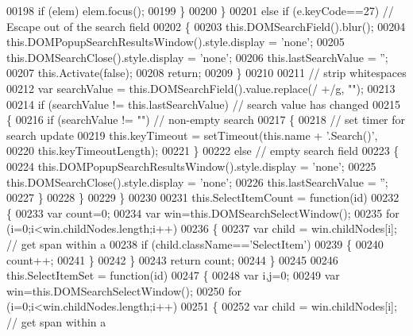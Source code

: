\begin{DoxyCode}
00198         \textcolor{keywordflow}{if} (elem) elem.focus();
00199       \}
00200     \}
00201     \textcolor{keywordflow}{else} \textcolor{keywordflow}{if} (e.keyCode==27) \textcolor{comment}{// Escape out of the search field}
00202     \{
00203       this.DOMSearchField().blur();
00204       this.DOMPopupSearchResultsWindow().style.display = \textcolor{stringliteral}{'none'};
00205       this.DOMSearchClose().style.display = \textcolor{stringliteral}{'none'};
00206       this.lastSearchValue = \textcolor{stringliteral}{''};
00207       this.Activate(\textcolor{keyword}{false});
00208       \textcolor{keywordflow}{return};
00209     \}
00210 
00211     \textcolor{comment}{// strip whitespaces}
00212     var searchValue = this.DOMSearchField().value.replace(/ +/g, \textcolor{stringliteral}{""});
00213 
00214     \textcolor{keywordflow}{if} (searchValue != this.lastSearchValue) \textcolor{comment}{// search value has changed}
00215     \{
00216       \textcolor{keywordflow}{if} (searchValue != \textcolor{stringliteral}{""}) \textcolor{comment}{// non-empty search}
00217       \{
00218         \textcolor{comment}{// set timer for search update}
00219         this.keyTimeout = setTimeout(this.name + \textcolor{stringliteral}{'.Search()'},
00220                                      this.keyTimeoutLength);
00221       \}
00222       \textcolor{keywordflow}{else} \textcolor{comment}{// empty search field}
00223       \{
00224         this.DOMPopupSearchResultsWindow().style.display = \textcolor{stringliteral}{'none'};
00225         this.DOMSearchClose().style.display = \textcolor{stringliteral}{'none'};
00226         this.lastSearchValue = \textcolor{stringliteral}{''};
00227       \}
00228     \}
00229   \}
00230 
00231   this.SelectItemCount = \textcolor{keyword}{function}(id)
00232   \{
00233     var count=0;
00234     var win=this.DOMSearchSelectWindow(); 
00235     \textcolor{keywordflow}{for} (i=0;i<win.childNodes.length;i++)
00236     \{
00237       var child = win.childNodes[i]; \textcolor{comment}{// get span within a}
00238       \textcolor{keywordflow}{if} (child.className==\textcolor{stringliteral}{'SelectItem'})
00239       \{
00240         count++;
00241       \}
00242     \}
00243     \textcolor{keywordflow}{return} count;
00244   \}
00245 
00246   this.SelectItemSet = \textcolor{keyword}{function}(id)
00247   \{
00248     var i,j=0;
00249     var win=this.DOMSearchSelectWindow(); 
00250     \textcolor{keywordflow}{for} (i=0;i<win.childNodes.length;i++)
00251     \{
00252       var child = win.childNodes[i]; \textcolor{comment}{// get span within a}

\end{DoxyCode}
